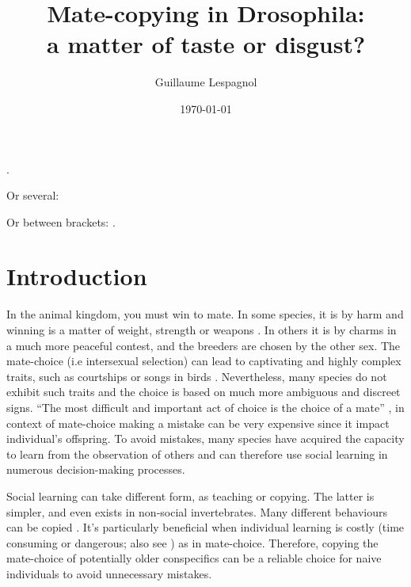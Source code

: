 \documentclass[a4paper, 12pt]{article}
\title{\Huge Mate-copying in Drosophila:\\ a matter of taste or disgust?}
\author{Guillaume Lespagnol}
\date{\today}
\begin{document}
	
	\maketitle
	
	\tableofcontents
	
	\bigskip
	
	
	\parencite[118]{danchin_cultural_2018}.

	Or several: \textcites[e.g.][118]{danchin_cultural_2018}[but see][1789]{danchin_cultural_2018}

	\parencite{}

	
	Or between brackets: \parencites{danchin_cultural_2018}[but see][1789]{dagaeff_drosophila_2016}.
	
	
	
	\section{Introduction}

	In the animal kingdom, you must win to mate. In some species, it is by harm and winning is a matter of weight, strength or weapons \parencite{anderson_grey_1985, clutton-brock_functions_1982}. In others it is by charms in a much more peaceful contest, and the breeders are chosen by the other sex.
	The mate-choice (i.e intersexual selection) can lead to captivating and highly complex traits, such as courtships or songs in birds \parencite{danchin_ecologie_2005}. Nevertheless, many species do not exhibit such traits and the choice is based on much more ambiguous and discreet signs.
	“The most difficult and important act of choice is the choice of a mate” \parencite{fisher_evolution_1915}, in context of mate-choice making a mistake can be very expensive since it impact individual’s offspring.
	To avoid mistakes, many species have acquired the capacity to learn from the observation of others and can therefore use social learning in numerous decision-making processes.
	
	Social learning can take different form, as teaching or copying. The latter is simpler, and even exists in non-social invertebrates\parencite{coolen_social_2005,laidre_mark_e._how_2010}. 
	Many different behaviours can be copied \parencite{thornton_alex_multi-generational_2010, van_leeuwen_group-specific_2014}.
	 It’s particularly beneficial when individual learning is costly (time consuming or dangerous; also see \parencite{webster_m.m_social_2008}) as in mate-choice.
	 Therefore, copying the mate-choice of potentially older conspecifics can be a reliable choice for naive individuals to avoid unnecessary mistakes.
	
\end{document}
